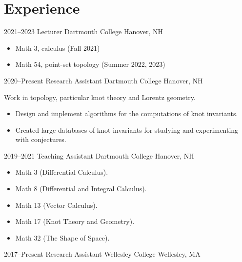 \documentclass[a4paper,sans]{moderncv}
\begin{document}
    \section{Experience}
        \cventry%
            {2021--2023}
            {Lecturer}
            {Dartmouth College}
            {Hanover, NH}
            {}
            {%
                \begin{itemize}
                    \item Math 3, calculus (Fall 2021)
                    \item Math 54, point-set topology (Summer 2022, 2023)
                \end{itemize}
            }
        \cventry%
            {2020--Present}
            {Research Assistant}
            {Dartmouth College}
            {Hanover, NH}
            {}
            {%
                Work in topology, particular knot theory and Lorentz geometry.
                \begin{itemize}
                    \item
                        Design and implement algorithms for the computations of
                        knot invariants.
                    \item
                        Created large databases of knot invariants for studying
                        and experimenting with conjectures.
                \end{itemize}%
             }
        \cventry%
            {2019--2021}
            {Teaching Assistant}
            {Dartmouth College}
            {Hanover, NH}
            {}
            {%
                \begin{itemize}
                    \item
                        Math 3 (Differential Calculus).
                    \item
                        Math 8 (Differential and Integral Calculus).
                    \item
                        Math 13 (Vector Calculus).
                    \item
                        Math 17 (Knot Theory and Geometry).
                    \item
                        Math 32 (The Shape of Space).
                \end{itemize}
            }
        \cventry%
            {2017--Present}
            {Research Assistant}
            {Wellesley College}
            {Wellesley, MA}
            {}
\end{document}
